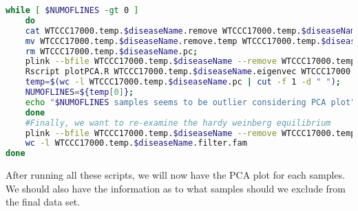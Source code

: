 \documentclass[12pt]{article}
\begin{document}
\begin{lstlisting}[language=bash]
	while [ $NUMOFLINES -gt 0 ]
	do
	cat WTCCC17000.temp.$diseaseName.remove WTCCC17000.temp.$diseaseName.pc > WTCCC17000.temp.$diseaseName.remove.temp;
	mv WTCCC17000.temp.$diseaseName.remove.temp WTCCC17000.temp.$diseaseName.remove;
	rm WTCCC17000.temp.$diseaseName.pc;
	plink --bfile WTCCC17000.temp.$diseaseName --remove WTCCC17000.temp.$diseaseName.remove --extract WTCCC17000.temp.$diseaseName.prune.in --threads 10 --pca --out WTCCC17000.temp.$diseaseName>/dev/null 2>&1;
	Rscript plotPCA.R WTCCC17000.temp.$diseaseName.eigenvec WTCCC17000.temp.$diseaseName WTCCC17000.temp.$diseaseName>/dev/null 2>&1;
	temp=$(wc -l WTCCC17000.temp.$diseaseName.pc | cut -f 1 -d " ");
	NUMOFLINES=${temp[0]};
	echo "$NUMOFLINES samples seems to be outlier considering PCA plot";
	done		
	#Finally, we want to re-examine the hardy weinberg equilibrium
	plink --bfile WTCCC17000.temp.$diseaseName --remove WTCCC17000.temp.$diseaseName.remove --geno 0.01 --mind 0.95 --maf 0.05 --hardy --out WTCCC17000.temp.$diseaseName.filter --make-bed >/dev/null 2>&1;
	wc -l WTCCC17000.temp.$diseaseName.filter.fam
done
	\end{lstlisting}

	After running all these scripts, we will now have the PCA plot for each samples. 
	We should also have the information as to what samples should we exclude from the final data set.
	
\end{document}

